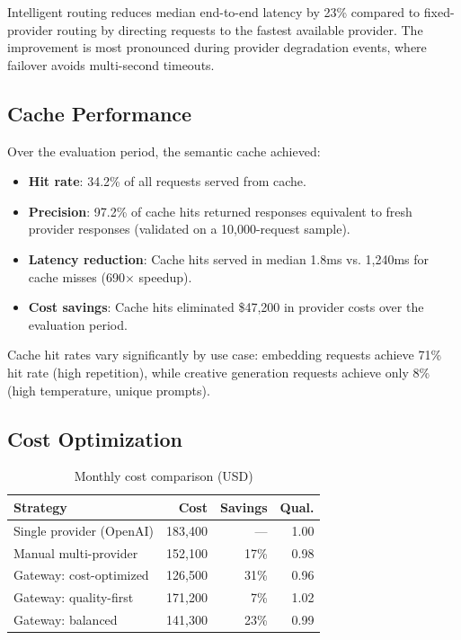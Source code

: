 Intelligent routing reduces median end-to-end latency by 23\% compared to fixed-provider routing by directing requests to the fastest available provider. The improvement is most pronounced during provider degradation events, where failover avoids multi-second timeouts.

\subsection{Cache Performance}

Over the evaluation period, the semantic cache achieved:

\begin{itemize}[leftmargin=*]
    \item \textbf{Hit rate}: 34.2\% of all requests served from cache.
    \item \textbf{Precision}: 97.2\% of cache hits returned responses equivalent to fresh provider responses (validated on a 10,000-request sample).
    \item \textbf{Latency reduction}: Cache hits served in median 1.8ms vs. 1,240ms for cache misses (690$\times$ speedup).
    \item \textbf{Cost savings}: Cache hits eliminated \$47,200 in provider costs over the evaluation period.
\end{itemize}

Cache hit rates vary significantly by use case: embedding requests achieve 71\% hit rate (high repetition), while creative generation requests achieve only 8\% (high temperature, unique prompts).

\subsection{Cost Optimization}

\begin{table}[t]
\centering
\caption{Monthly cost comparison (USD)}
\label{tab:cost}
\begin{tabular}{@{}lrrr@{}}
\toprule
\textbf{Strategy} & \textbf{Cost} & \textbf{Savings} & \textbf{Qual.} \\
\midrule
Single provider (OpenAI) & 183,400 & --- & 1.00 \\
Manual multi-provider & 152,100 & 17\% & 0.98 \\
Gateway: cost-optimized & 126,500 & 31\% & 0.96 \\
Gateway: quality-first & 171,200 & 7\% & 1.02 \\
Gateway: balanced & 141,300 & 23\% & 0.99 \\
\bottomrule
\end{tabular}
\end{table}

